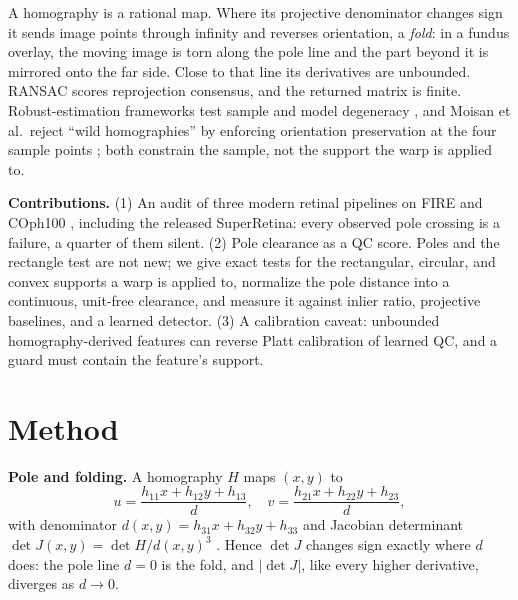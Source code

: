 \documentclass{article}
\newcommand{\sr}{SuperRetina}
\begin{document}
A homography is a rational map. Where its projective denominator changes sign
it sends image points through infinity and reverses orientation, a
\emph{fold}: in a fundus overlay, the moving image is torn along the pole line
and the part beyond it is mirrored onto the far side. Close to that line its
derivatives are unbounded. RANSAC scores reprojection consensus, and the
returned matrix is finite. Robust-estimation frameworks test sample and model
degeneracy \cite{usac}, and Moisan et al.\ reject ``wild homographies'' by
enforcing orientation preservation at the four sample points \cite{moisan};
both constrain the sample, not the support the warp is applied to.

\textbf{Contributions.} (1) An audit of three modern retinal pipelines on
FIRE and COph100 \cite{fire,coph}, including the released \sr{}: every
observed pole crossing is a failure, a quarter of them silent. (2) Pole
clearance as a QC score. Poles and the rectangle test are not new; we give
exact tests for the rectangular, circular, and convex supports a warp is
applied to, normalize the pole distance into a continuous, unit-free
clearance, and measure it against inlier ratio, projective baselines, and a
learned detector. (3) A calibration caveat: unbounded homography-derived
features can reverse Platt calibration of learned QC, and a guard must
contain the feature's support.

\section{Method}
\label{sec:method}

\textbf{Pole and folding.} A homography $H$ maps $(x,y)$ to
\begin{equation}
u=\frac{h_{11}x+h_{12}y+h_{13}}{d},\quad
v=\frac{h_{21}x+h_{22}y+h_{23}}{d},
\label{eq:h}
\end{equation}
with denominator $d(x,y)=h_{31}x+h_{32}y+h_{33}$ and Jacobian determinant
$\det J(x,y)=\det H/d(x,y)^3$ \cite{hartley}. Hence $\det J$ changes sign
exactly where $d$ does: the pole line $d=0$ is the fold, and $|\det J|$, like
every higher derivative, diverges as $d\to0$.
\end{document}
